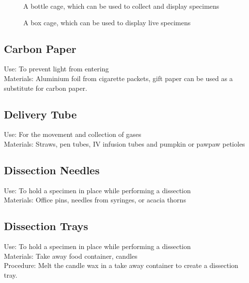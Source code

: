 \begin{figure}[H]
\begin{center}
\def\svgwidth{2.5cm}

\caption{A bottle cage, which can be used to collect and display specimens}
\label{fig:bottle-cage}
\end{center}
\end{figure}

\begin{figure}[H]
\begin{center}
\def\svgwidth{6cm}

\caption{A box cage, which can be used to display live specimens}
\label{fig:box-cage}
\end{center}
\end{figure}


\subsection*{Carbon Paper}


Use: To prevent light from entering\\
Materials: Aluminium foil from cigarette packets, gift paper can be used as a substitute for carbon paper. \\


\subsection*{Delivery Tube}


Use: For the movement and collection of gases\\
Materials: Straws, pen tubes, IV infusion tubes and pumpkin or pawpaw petioles\\


\subsection*{Dissection Needles}


Use: To hold a specimen in place while performing a dissection\\
Materials: Office pins, needles from syringes, or acacia thorns\\


\subsection*{Dissection Trays}


Use: To hold a specimen in place while performing a dissection\\
Materials: Take away food container, candles\\
Procedure: Melt the candle wax in a take away container to create a dissection tray.\\


